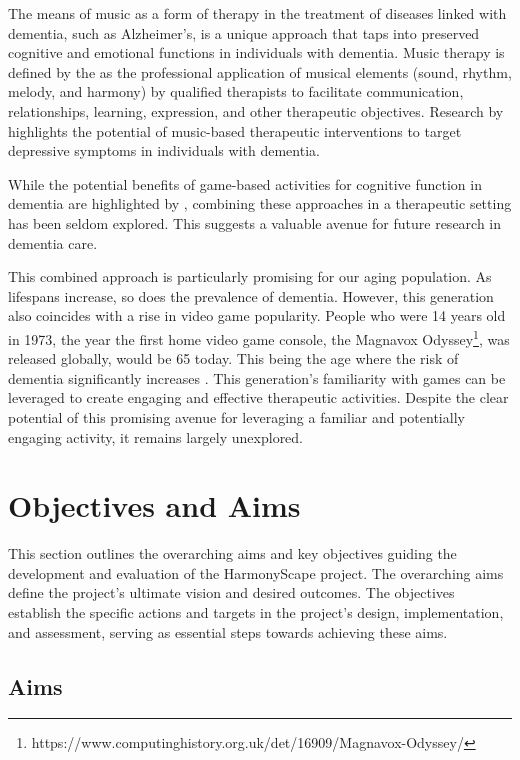 \documentclass{l4proj}
\begin{document}
The means of music as a form of therapy in the treatment of diseases linked with dementia, such as Alzheimer's, is a unique approach that taps into preserved cognitive and emotional functions in individuals with dementia. Music therapy is defined by the \cite{noauthor_world_nodate} as the professional application of musical elements (sound, rhythm, melody, and harmony) by qualified therapists to facilitate communication, relationships, learning, expression, and other therapeutic objectives. Research by \cite{vink_music_2004} highlights the potential of music-based therapeutic interventions to target depressive symptoms in individuals with dementia.

While the potential benefits of game-based activities for cognitive function in dementia are highlighted by \cite{zheng2017gamebased}, combining these approaches in a therapeutic setting has been seldom explored. This suggests a valuable avenue for future research in dementia care.

This combined approach is particularly promising for our aging population. As lifespans increase, so does the prevalence of dementia. However, this generation also coincides with a rise in video game popularity. People who were 14 years old in 1973, the year the first home video game console, the Magnavox Odyssey\footnote{https://www.computinghistory.org.uk/det/16909/Magnavox-Odyssey/}, was released globally, would be 65 today. This being the age where the risk of dementia significantly increases \citep{chen_risk_2009}. This generation's familiarity with games can be leveraged to create engaging and effective therapeutic activities. Despite the clear potential of this promising avenue for leveraging a familiar and potentially engaging activity, it remains largely unexplored.

\section{Objectives and Aims}
This section outlines the overarching aims and key objectives guiding the development and evaluation of the HarmonyScape project. The overarching aims define the project's ultimate vision and desired outcomes. The objectives establish the specific actions and targets in the project's design, implementation, and assessment, serving as essential steps towards achieving these aims.

\subsection{Aims}
\end{document}
